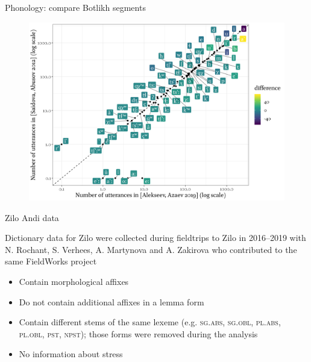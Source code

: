 \begin{frame}{Phonology: compare Botlikh segments}
\begin{figure}[h]
\centering
\includegraphics[width = \linewidth]{images/05_compare_botlikh_dicts_without_stress.png}
\end{figure}
\end{frame}

\begin{frame}{Zilo Andi data}

Dictionary data for Zilo were collected during fieldtrips to Zilo in 2016–2019 with N. Rochant, S. Verhees, A. Martynova and A. Zakirova who contributed to the same FieldWorks project

\begin{itemize}
    \item Contain morphological affixes
    \item Do not contain additional affixes in a lemma form
    \item Contain different stems of the same lexeme (e.g. \textsc{sg.abs, sg.obl, pl.abs, pl.obl, pst, npst}); those forms were removed during the analysis
    \item No information about stress
\end{itemize}

\end{frame}

